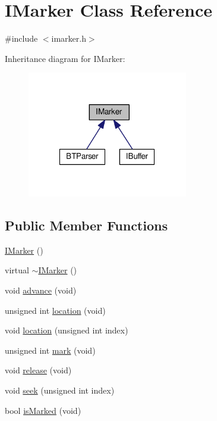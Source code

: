 \hypertarget{class_i_marker}{\section{I\-Marker Class Reference}
\label{class_i_marker}
}


{\ttfamily \#include $<$imarker.\-h$>$}



Inheritance diagram for I\-Marker\-:
\nopagebreak
\begin{figure}[H]
\begin{center}
\leavevmode
\includegraphics[width=199pt]{class_i_marker__inherit__graph}
\end{center}
\end{figure}
\subsection*{Public Member Functions}
\begin{DoxyCompactItemize}
\item 
\hyperlink{class_i_marker_afbe7a5bbe8cb8f1b86e7ebf7d62782d4}{I\-Marker} ()
\item 
virtual \hyperlink{class_i_marker_afefb80c6283b5f2327faa16ab131c875}{$\sim$\-I\-Marker} ()
\item 
void \hyperlink{class_i_marker_a68c539e79c3052ba7addf090dfd05985}{advance} (void)
\item 
unsigned int \hyperlink{class_i_marker_a0e9628e8c66b493ff331abab55c744da}{location} (void)
\item 
void \hyperlink{class_i_marker_ac2d7a0e8bbfb213378f7a19b50ec9686}{location} (unsigned int index)
\item 
unsigned int \hyperlink{class_i_marker_a92024922612faa5bb0106609f151c050}{mark} (void)
\item 
void \hyperlink{class_i_marker_afce4bb0bef01b4579db97e1ca5e64001}{release} (void)
\item 
void \hyperlink{class_i_marker_a58086bbf091c5b49c15464a070fec171}{seek} (unsigned int index)
\item 
bool \hyperlink{class_i_marker_ae6fda228fa071a9720e7d2309d47ac6e}{is\-Marked} (void)
\end{DoxyCompactItemize}
